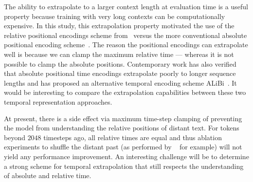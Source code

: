 \documentclass[11pt, a4paper, logo, internal, copyright, nonumbering]{deepmind}
\begin{document}
The ability to extrapolate to a larger context length at evaluation time is a useful property because training with very long contexts can be computationally expensive. In this study, this extrapolation property motivated the use of the relative positional encodings scheme from~\citep{dai2019transformer} versus the more conventional absolute positional encoding scheme~\citep{vaswani2017attention, gpt3}. The reason the positional encodings can extrapolate well is because we can clamp the maximum relative time --- whereas it is not possible to clamp the absolute positions. Contemporary work has also verified that absolute positional time encodings extrapolate poorly to longer sequence lengths and has proposed an alternative temporal encoding scheme ALiBi~\citep{press2021train}. It would be interesting to compare the extrapolation capabilities between these two temporal representation approaches.

At present, there is a side effect via maximum time-step clamping of preventing the model from understanding the relative positions of distant text. For tokens beyond $2048$ timesteps ago, all relative times are equal and thus ablation experiments to shuffle the distant past (as performed by ~\citet{sun2021long} for example) will not yield any performance improvement. An interesting challenge will be to determine a strong scheme for temporal extrapolation that still respects the understanding of absolute and relative time.
\end{document}

